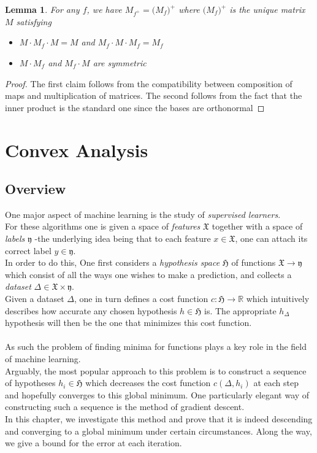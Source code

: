 \documentclass{book}
\theoremstyle{plain}
\newtheorem{lemma}[corollary]{Lemma}
\theoremstyle{definition}
\renewcommand{\d}[1]{\mathbb{#1}}
\newcommand{\f}[1]{\mathfrak{#1}}
\newcommand{\mor}{\longrightarrow}
\begin{document}
\begin{lemma}\label{lem:mppscoordinates}
	For any $f$, we have $M_{f^+}=\big( M_f\big)^+$ where $ \big(M_f\big)^+$ is the unique matrix $M$ satisfying
	\begin{itemize}
		\item $M\cdot M_f \cdot M=M$ and $M_f \cdot M \cdot M_f=M_f$
		\item $M\cdot M_f$ and $M_f \cdot M$ are symmetric
	\end{itemize}
\end{lemma}

\begin{proof}
	The first claim follows from the compatibility between composition of maps and multiplication of matrices. The second follows from the fact that the inner product is the standard one since the bases are orthonormal
\end{proof}

\chapter{Convex Analysis}



\section{Overview}
One major aspect of machine learning is the study of \emph{supervised learners}. \\
For these algorithms one is given a space of \emph{features} $\f{X}$ together with a space of \emph{labels} $\f{y}$ -the underlying idea being that to each feature $x \in \f{X}$, one can attach its correct label $y \in \f{y}$.\\ 
In order to do this, One first considers a \emph{hypothesis space} $\f{H}$ of functions $\f{X}\mor \f{y}$ which consist of all the ways one wishes to make a prediction, and collects a \emph{dataset} $\Delta \in \f{X}\times \f{y}$.\\
Given a dataset $\Delta$, one in turn defines a cost function $c: \f{H}\mor \d{R}$ which intuitively describes how accurate any chosen hypothesis $h \in \f{H}$ is. The appropriate $h_\Delta$ hypothesis will then be the one that minimizes this cost function.\\\\
As such the problem of finding minima for functions plays a key role in the field of machine learning.\\
Arguably, the most popular approach to this problem is to construct a sequence of hypotheses $h_i \in \f{H}$ which decreases the cost function $c(\Delta,h_i)$ at each step and hopefully converges to this global minimum. One particularly elegant way of constructing such a sequence is the method of gradient descent.\\
In this chapter, we investigate this method and prove that it is indeed descending and converging to a global minimum under certain circumstances. Along the way, we give a bound for the error at each iteration.
\end{document}
